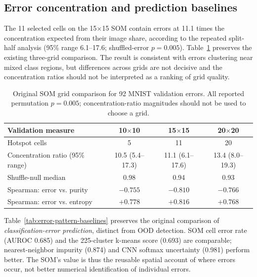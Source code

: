 \documentclass[11pt]{article}
\begin{document}
\subsection{Error concentration and prediction baselines}
The 11 selected cells on the 15$\times$15 SOM contain errors at 11.1 times the concentration expected from their image share, according to the repeated split-half analysis (95\% range 6.1--17.6; shuffled-error $p=0.005$). Table~\ref{tab:phase2} preserves the existing three-grid comparison. The result is consistent with errors clustering near mixed class regions, but differences across grids are not decisive and the concentration ratios should not be interpreted as a ranking of grid quality.

\begin{table}[htbp]\centering\small\setlength{\tabcolsep}{4pt}\renewcommand{\arraystretch}{1.15}
\begin{tabular}{@{}lccc@{}}\toprule
Validation measure & 10$\times$10 & 15$\times$15 & 20$\times$20\\\midrule
Hotspot cells & 5 & 11 & 20\\
Concentration ratio (95\% range) & 10.5 (5.4--17.3) & 11.1 (6.1--17.6) & 13.4 (8.0--19.3)\\
Shuffle-null median & 0.98 & 0.94 & 0.93\\
Spearman: error vs. purity & $-0.755$ & $-0.810$ & $-0.766$\\
Spearman: error vs. entropy & $+0.778$ & $+0.816$ & $+0.768$\\\bottomrule
\end{tabular}
\caption{Original SOM grid comparison for 92 MNIST validation errors. All reported permutation $p=0.005$; concentration-ratio magnitudes should not be used to choose a grid.}\label{tab:phase2}
\end{table}

Table~\ref{tab:error-pattern-baselines} preserves the original comparison of \emph{classification-error prediction}, distinct from OOD detection. SOM cell error rate (AUROC 0.685) and the 225-cluster k-means score (0.693) are comparable; nearest-neighbor impurity (0.874) and CNN softmax uncertainty (0.981) perform better. The SOM's value is thus the reusable spatial account of where errors occur, not better numerical identification of individual errors.
{\setlength{\tabcolsep}{2.3pt}}
\end{document}
